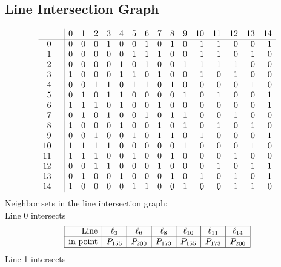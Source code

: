 \documentclass{article}
\begin{document}
{\subsection*{Line Intersection Graph}
{\arraycolsep=1pt
$$
\begin{array}{rr|*{15}r}
 &  & 0 & 1 & 2 & 3 & 4 & 5 & 6 & 7 & 8 & 9 & 10 & 11 & 12 & 13 & 14\\
\hline
0 &  & 0 & 0 & 0 & 1 & 0 & 0 & 1 & 0 & 1 & 0 & 1 & 1 & 0 & 0 & 1\\
1 &  & 0 & 0 & 0 & 0 & 0 & 1 & 1 & 1 & 0 & 0 & 1 & 1 & 0 & 1 & 0\\
2 &  & 0 & 0 & 0 & 0 & 1 & 0 & 1 & 0 & 0 & 1 & 1 & 1 & 1 & 0 & 0\\
3 &  & 1 & 0 & 0 & 0 & 1 & 1 & 0 & 1 & 0 & 0 & 1 & 0 & 1 & 0 & 0\\
4 &  & 0 & 0 & 1 & 1 & 0 & 1 & 1 & 0 & 1 & 0 & 0 & 0 & 0 & 1 & 0\\
5 &  & 0 & 1 & 0 & 1 & 1 & 0 & 0 & 0 & 0 & 1 & 0 & 1 & 0 & 0 & 1\\
6 &  & 1 & 1 & 1 & 0 & 1 & 0 & 0 & 1 & 0 & 0 & 0 & 0 & 0 & 0 & 1\\
7 &  & 0 & 1 & 0 & 1 & 0 & 0 & 1 & 0 & 1 & 1 & 0 & 0 & 1 & 0 & 0\\
8 &  & 1 & 0 & 0 & 0 & 1 & 0 & 0 & 1 & 0 & 1 & 0 & 1 & 0 & 1 & 0\\
9 &  & 0 & 0 & 1 & 0 & 0 & 1 & 0 & 1 & 1 & 0 & 1 & 0 & 0 & 0 & 1\\
10 &  & 1 & 1 & 1 & 1 & 0 & 0 & 0 & 0 & 0 & 1 & 0 & 0 & 0 & 1 & 0\\
11 &  & 1 & 1 & 1 & 0 & 0 & 1 & 0 & 0 & 1 & 0 & 0 & 0 & 1 & 0 & 0\\
12 &  & 0 & 0 & 1 & 1 & 0 & 0 & 0 & 1 & 0 & 0 & 0 & 1 & 0 & 1 & 1\\
13 &  & 0 & 1 & 0 & 0 & 1 & 0 & 0 & 0 & 1 & 0 & 1 & 0 & 1 & 0 & 1\\
14 &  & 1 & 0 & 0 & 0 & 0 & 1 & 1 & 0 & 0 & 1 & 0 & 0 & 1 & 1 & 0\\
\end{array}
$$
}%
Neighbor sets in the line intersection graph:\\
Line 0 intersects 
$$
\begin{array}{|r*{6}{|c}|}
\hline
\mbox{Line}  & \ell_{3} & \ell_{6} & \ell_{8} & \ell_{10} & \ell_{11} & \ell_{14}\\
\hline
\mbox{in point}  & P_{155} & P_{200} & P_{173} & P_{155} & P_{173} & P_{200}\\
\hline
\end{array}
$$
Line 1 intersects 
$$
\begin{array}{|r*{6}{|c}|}

\end{array}$$}
\end{document}
